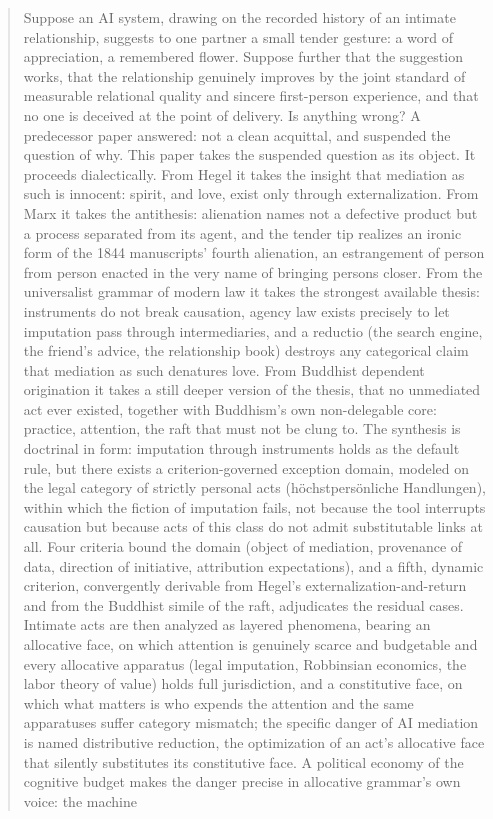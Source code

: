 
\begin{abstract}
\noindent
Suppose an AI system, drawing on the recorded history of an intimate relationship, suggests to one partner a small tender gesture: a word of appreciation, a remembered flower. Suppose further that the suggestion works, that the relationship genuinely improves by the joint standard of measurable relational quality and sincere first-person experience, and that no one is deceived at the point of delivery. Is anything wrong? A predecessor paper answered: not a clean acquittal, and suspended the question of why. This paper takes the suspended question as its object. It proceeds dialectically. From Hegel it takes the insight that mediation as such is innocent: spirit, and love, exist only through externalization. From Marx it takes the antithesis: alienation names not a defective product but a process separated from its agent, and the tender tip realizes an ironic form of the 1844 manuscripts' fourth alienation, an estrangement of person from person enacted in the very name of bringing persons closer. From the universalist grammar of modern law it takes the strongest available thesis: instruments do not break causation, agency law exists precisely to let imputation pass through intermediaries, and a reductio (the search engine, the friend's advice, the relationship book) destroys any categorical claim that mediation as such denatures love. From Buddhist dependent origination it takes a still deeper version of the thesis, that no unmediated act ever existed, together with Buddhism's own non-delegable core: practice, attention, the raft that must not be clung to. The synthesis is doctrinal in form: imputation through instruments holds as the default rule, but there exists a criterion-governed exception domain, modeled on the legal category of strictly personal acts (h\"ochstpers\"onliche Handlungen), within which the fiction of imputation fails, not because the tool interrupts causation but because acts of this class do not admit substitutable links at all. Four criteria bound the domain (object of mediation, provenance of data, direction of initiative, attribution expectations), and a fifth, dynamic criterion, convergently derivable from Hegel's externalization-and-return and from the Buddhist simile of the raft, adjudicates the residual cases. Intimate acts are then analyzed as layered phenomena, bearing an allocative face, on which attention is genuinely scarce and budgetable and every allocative apparatus (legal imputation, Robbinsian economics, the labor theory of value) holds full jurisdiction, and a constitutive face, on which what matters is who expends the attention and the same apparatuses suffer category mismatch; the specific danger of AI mediation is named distributive reduction, the optimization of an act's allocative face that silently substitutes its constitutive face. A political economy of the cognitive budget makes the danger precise in allocative grammar's own voice: the machine 
\end{abstract}
